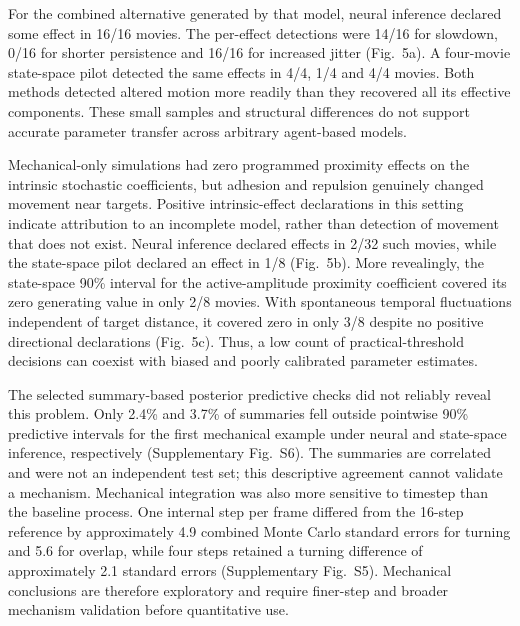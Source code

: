 \documentclass[12pt]{article}
\begin{document}
For the combined alternative generated by that model, neural inference declared some effect in 16/16 movies. The per-effect detections were 14/16 for slowdown, 0/16 for shorter persistence and 16/16 for increased jitter (Fig.~5a). A four-movie state-space pilot detected the same effects in 4/4, 1/4 and 4/4 movies. Both methods detected altered motion more readily than they recovered all its effective components. These small samples and structural differences do not support accurate parameter transfer across arbitrary agent-based models.

Mechanical-only simulations had zero programmed proximity effects on the intrinsic stochastic coefficients, but adhesion and repulsion genuinely changed movement near targets. Positive intrinsic-effect declarations in this setting indicate attribution to an incomplete model, rather than detection of movement that does not exist. Neural inference declared effects in 2/32 such movies, while the state-space pilot declared an effect in 1/8 (Fig.~5b). More revealingly, the state-space 90\% interval for the active-amplitude proximity coefficient covered its zero generating value in only 2/8 movies. With spontaneous temporal fluctuations independent of target distance, it covered zero in only 3/8 despite no positive directional declarations (Fig.~5c). Thus, a low count of practical-threshold decisions can coexist with biased and poorly calibrated parameter estimates.

The selected summary-based posterior predictive checks did not reliably reveal this problem. Only 2.4\% and 3.7\% of summaries fell outside pointwise 90\% predictive intervals for the first mechanical example under neural and state-space inference, respectively (Supplementary Fig.~S6). The summaries are correlated and were not an independent test set; this descriptive agreement cannot validate a mechanism. Mechanical integration was also more sensitive to timestep than the baseline process. One internal step per frame differed from the 16-step reference by approximately 4.9 combined Monte Carlo standard errors for turning and 5.6 for overlap, while four steps retained a turning difference of approximately 2.1 standard errors (Supplementary Fig.~S5). Mechanical conclusions are therefore exploratory and require finer-step and broader mechanism validation before quantitative use.
\end{document}
